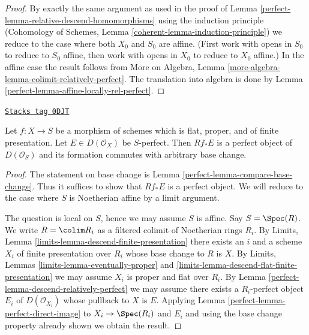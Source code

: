 \begin{proof}
\medskip\noindent
By exactly the same argument as used in
the proof of Lemma \ref{perfect-lemma-relative-descend-homomorphisms}
using the induction principle
(Cohomology of Schemes, Lemma \ref{coherent-lemma-induction-principle})
we reduce to the case where both $X_0$ and $S_0$
are affine. (First work with opens in $S_0$ to reduce to
$S_0$ affine, then work with opens in $X_0$ to reduce to
$X_0$ affine.) In the affine case the result follows from
More on Algebra, Lemma \ref{more-algebra-lemma-colimit-relatively-perfect}.
The translation into algebra is done by
Lemma \ref{perfect-lemma-affine-locally-rel-perfect}.
\end{proof}

\begin{lemma}
\label{perfect-lemma-derived-pushforward-rel-perfect}
\href{https://stacks.math.columbia.edu/tag/0DJT}{\texttt{Stacks tag 0DJT}}

Let $f : X \to S$ be a morphism of schemes which is flat, proper, and
of finite presentation. Let $E \in D(\mathcal{O}_X)$ be $S$-perfect.
Then $Rf_*E$ is a perfect object of $D(\mathcal{O}_S)$
and its formation commutes with arbitrary base change.
\end{lemma}

\begin{proof}

The statement on base change is Lemma \ref{perfect-lemma-compare-base-change}.
Thus it suffices to show that $Rf_*E$ is a perfect object. We will reduce
to the case where $S$ is Noetherian affine by a limit argument.

\medskip\noindent
The question is local on $S$, hence we may assume $S$ is affine.
Say $S = \Spec(R)$. We write $R = \colim R_i$ as a filtered colimit
of Noetherian rings $R_i$. By Limits, Lemma
\ref{limits-lemma-descend-finite-presentation}
there exists an $i$ and a scheme $X_i$ of finite presentation over $R_i$
whose base change to $R$ is $X$. By
Limits, Lemmas \ref{limits-lemma-eventually-proper} and
\ref{limits-lemma-descend-flat-finite-presentation}
we may assume $X_i$ is proper and flat over $R_i$.
By Lemma \ref{perfect-lemma-descend-relatively-perfect}
we may assume there exists a $R_i$-perfect object $E_i$ of
$D(\mathcal{O}_{X_i})$ whose pullback to $X$ is $E$.
Applying Lemma \ref{perfect-lemma-perfect-direct-image}
to $X_i \to \Spec(R_i)$ and $E_i$ and using the
base change property already shown we obtain the result.
\end{proof}

